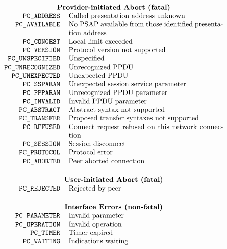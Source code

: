 
\normalsize
\[\begin{tabular}{rp{3.0in}}
	\multicolumn{2}{c}{\bf Provider-initiated Abort (fatal)}\\
\tt PC\_ADDRESS&	Called presentation address unknown\\
\tt PC\_AVAILABLE&	No PSAP available from those identified
			presentation address\\
\tt PC\_CONGEST&	Local limit exceeded\\
\tt PC\_VERSION&	Protocol version not supported\\
\tt PC\_UNSPECIFIED&	Unspecified\\
\tt PC\_UNRECOGNIZED&	Unrecognized PPDU\\
\tt PC\_UNEXPECTED&	Unexpected PPDU\\
\tt PC\_SSPARAM&	Unexpected session service parameter\\
\tt PC\_PPPARAM&	Unrecognized PPDU parameter\\
\tt PC\_INVALID&	Invalid PPDU parameter\\
\tt PC\_ABSTRACT&	Abstract syntax not supported\\
\tt PC\_TRANSFER&	Proposed transfer syntaxes not supported\\
\tt PC\_REFUSED&	Connect request refused on this network connection\\
\tt PC\_SESSION&	Session disconnect\\
\tt PC\_PROTOCOL&	Protocol error\\
\tt PC\_ABORTED&	Peer aborted connection\\[0.2in]
	\multicolumn{2}{c}{\bf User-initiated Abort (fatal)}\\
\tt PC\_REJECTED&	Rejected by peer\\[0.2in]
	\multicolumn{2}{c}{\bf Interface Errors (non-fatal)}\\
\tt PC\_PARAMETER&	Invalid parameter\\
\tt PC\_OPERATION&	Invalid operation\\
\tt PC\_TIMER&		Timer expired\\
\tt PC\_WAITING&	Indications waiting
\end{tabular}\]
